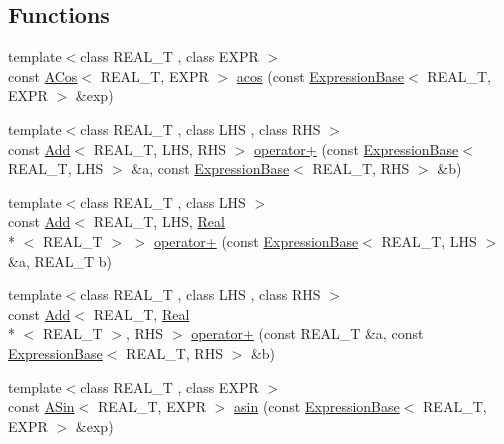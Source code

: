 \subsection*{Functions}
\begin{DoxyCompactItemize}
\item 
{\footnotesize template$<$class R\+E\+A\+L\+\_\+\+T , class E\+X\+P\+R $>$ }\\const \hyperlink{structatl_1_1_a_cos}{A\+Cos}$<$ R\+E\+A\+L\+\_\+\+T, E\+X\+P\+R $>$ \hyperlink{namespaceatl_ada7003ca534db5beaf82003907268317}{acos} (const \hyperlink{structatl_1_1_expression_base}{Expression\+Base}$<$ R\+E\+A\+L\+\_\+\+T, E\+X\+P\+R $>$ \&exp)
\item 
{\footnotesize template$<$class R\+E\+A\+L\+\_\+\+T , class L\+H\+S , class R\+H\+S $>$ }\\const \hyperlink{structatl_1_1_add}{Add}$<$ R\+E\+A\+L\+\_\+\+T, L\+H\+S, R\+H\+S $>$ \hyperlink{namespaceatl_ae5e3def2b4af7add11836b4dc4d1605e}{operator+} (const \hyperlink{structatl_1_1_expression_base}{Expression\+Base}$<$ R\+E\+A\+L\+\_\+\+T, L\+H\+S $>$ \&a, const \hyperlink{structatl_1_1_expression_base}{Expression\+Base}$<$ R\+E\+A\+L\+\_\+\+T, R\+H\+S $>$ \&b)
\item 
{\footnotesize template$<$class R\+E\+A\+L\+\_\+\+T , class L\+H\+S $>$ }\\const \hyperlink{structatl_1_1_add}{Add}$<$ R\+E\+A\+L\+\_\+\+T, L\+H\+S, \hyperlink{structatl_1_1_real}{Real}\\*
$<$ R\+E\+A\+L\+\_\+\+T $>$ $>$ \hyperlink{namespaceatl_ae056ad3c59c730ffb1a857f74a769e89}{operator+} (const \hyperlink{structatl_1_1_expression_base}{Expression\+Base}$<$ R\+E\+A\+L\+\_\+\+T, L\+H\+S $>$ \&a, R\+E\+A\+L\+\_\+\+T b)
\item 
{\footnotesize template$<$class R\+E\+A\+L\+\_\+\+T , class L\+H\+S , class R\+H\+S $>$ }\\const \hyperlink{structatl_1_1_add}{Add}$<$ R\+E\+A\+L\+\_\+\+T, \hyperlink{structatl_1_1_real}{Real}\\*
$<$ R\+E\+A\+L\+\_\+\+T $>$, R\+H\+S $>$ \hyperlink{namespaceatl_ab6356ac7728633992e3c7ea9f55b0566}{operator+} (const R\+E\+A\+L\+\_\+\+T \&a, const \hyperlink{structatl_1_1_expression_base}{Expression\+Base}$<$ R\+E\+A\+L\+\_\+\+T, R\+H\+S $>$ \&b)
\item 
{\footnotesize template$<$class R\+E\+A\+L\+\_\+\+T , class E\+X\+P\+R $>$ }\\const \hyperlink{structatl_1_1_a_sin}{A\+Sin}$<$ R\+E\+A\+L\+\_\+\+T, E\+X\+P\+R $>$ \hyperlink{namespaceatl_a204dcfa24d4e9b9b54b69c0c684cdc41}{asin} (const \hyperlink{structatl_1_1_expression_base}{Expression\+Base}$<$ R\+E\+A\+L\+\_\+\+T, E\+X\+P\+R $>$ \&exp)

\end{DoxyCompactItemize}
